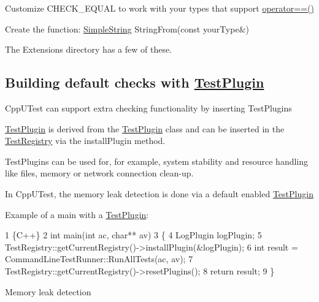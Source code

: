 Customize C\+H\+E\+C\+K\+\_\+\+E\+Q\+U\+AL to work with your types that support \hyperlink{_simple_string_8cpp_a8bb3fb55107a2023bb828539fa6fe045}{operator==()}


\begin{DoxyItemize}
\item Create the function\+: {\ttfamily \hyperlink{class_simple_string}{Simple\+String} String\+From(const your\+Type\&)}
\end{DoxyItemize}

The Extensions directory has a few of these.

\subsection*{Building default checks with \hyperlink{class_test_plugin}{Test\+Plugin}}


\begin{DoxyItemize}
\item Cpp\+U\+Test can support extra checking functionality by inserting Test\+Plugins
\item \hyperlink{class_test_plugin}{Test\+Plugin} is derived from the \hyperlink{class_test_plugin}{Test\+Plugin} class and can be inserted in the \hyperlink{class_test_registry}{Test\+Registry} via the install\+Plugin method.
\item Test\+Plugins can be used for, for example, system stability and resource handling like files, memory or network connection clean-\/up.
\item In Cpp\+U\+Test, the memory leak detection is done via a default enabled \hyperlink{class_test_plugin}{Test\+Plugin}
\end{DoxyItemize}

Example of a main with a \hyperlink{class_test_plugin}{Test\+Plugin}\+:


\begin{DoxyCode}
1 \{C++\}
2 int main(int ac, char** av)
3 \{
4    LogPlugin logPlugin;
5    TestRegistry::getCurrentRegistry()->installPlugin(&logPlugin);
6    int result = CommandLineTestRunner::RunAllTests(ac, av);
7    TestRegistry::getCurrentRegistry()->resetPlugins();
8    return result;
9 \}
\end{DoxyCode}


Memory leak detection



